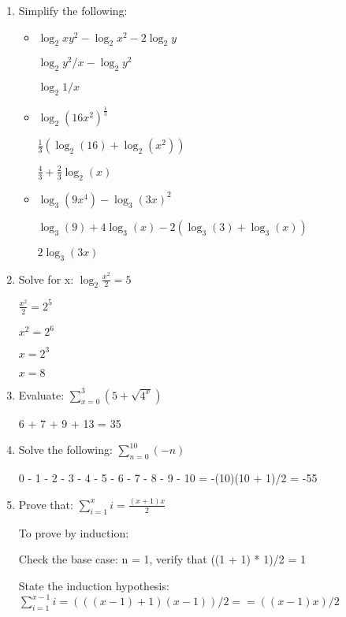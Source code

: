 \documentclass[11pt]{article}
\begin{document}
\begin{enumerate}[leftmargin=*]

\item Simplify the following: 
\begin{itemize}
    \item \( \log_2 xy^2 - \log_2 x^2 - 2 \log_2 y \)
    
    \( \log_2 y^2/x - \log_2 y^2 \)
    
    \( \log_2 1/x \)
    \item \( \log_2 (16x^2)^\frac{1}{3} \)
    
    \( \frac{1}{3} (\log_2 (16) + \log_2 (x^2)) \)
    
    \( \frac{4}{3} + \frac{2}{3} \log_2 (x) \)
    \item \( \log_3(9x^4) - \log_3(3x)^2\)
    
    \( \log_3(9) + 4\log_3(x) - 2(\log_3(3) + \log_3(x))\)
    
    \( 2\log_3(3x)\)
\end{itemize}

\item Solve for x: \( \log_{2} \frac{x^2}{2} = 5 \)

\( \frac{x^2}{2} = 2^5 \)

\( x^2 = 2^6 \)

\( x = 2^3 \)

\( x = 8 \)

\item Evaluate: \( \sum\limits_{x=0}^3 (5 + \sqrt{4^x}) \)

6 + 7 + 9 + 13 = 35

\item Solve the following: \( \sum\limits_{n=0}^{10} (-n) \)

0 - 1 - 2 - 3 - 4 - 5 - 6 - 7 - 8 - 9 - 10 = -(10)(10 + 1)/2 = -55

\item Prove that: \( \sum\limits_{i=1}^{x} i = \frac{(x + 1)x}{2} \)

To prove by induction:

Check the base case: n = 1, verify that ((1 + 1) * 1)/2 = 1

State the induction hypothesis: \( \sum\limits_{i=1}^{x-1} i=(((x-1) + 1)(x-1))/2 == ((x-1)x)/2 \)


\end{enumerate}
\end{document}
